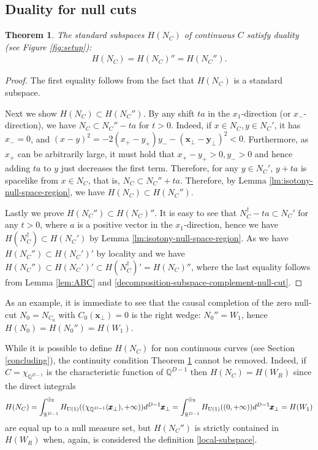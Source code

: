 \documentclass[12pt]{article}
\def\RR{{\mathbb R}}
\def\uone{{\rm U(1)}}
\def\tx{\pmb{x}}
\newtheorem{theorem}{Theorem}[section]
\theoremstyle{remark}
\begin{document}
\subsection{Duality for null cuts}

\begin{theorem}\label{thm:completeness}
	The standard subspaces $H(N_C)$ of continuous $C$ satisfy duality (see Figure \ref{fig:setup}): 
	\begin{align*}
		H(N_C)=H(N_C)''=H(N_C'').
	\end{align*}
\end{theorem} 
\begin{proof}
	The first equality follows from the fact that $H(N_C)$ is a standard subspace.
	
	
	Next we show $H(N_C) \subset H(N_C'')$.
	By any shift $ta$ in the $x_1$-direction (or $x_-$-direction), we have $N_C \subset N_C'' - ta$ for $t>0$.
	Indeed, if $x \in N_C, y\in N_C'$, it has $x_- = 0$, and $(x - y)^2 = -2(x_+ - y_+)y_- - (\pmb{x}_\perp - \pmb{y}_\perp)^2 < 0$.
	Furthermore, as $x_+$ can be arbitrarily large, it must hold that $x_+ - y_+>0, y_->0$
	and hence adding $ta$ to $y$ just decreases the first term.
	Therefore, for any $y \in N_C'$, $y+ta$ is spacelike from $x \in N_C$, that is,
	$N_C \subset N_C'' + ta$.
	Therefore, by Lemma \ref{lm:isotony-null-space-region}, we have $H(N_C)\subset H(N_C'')$.
	
	Lastly we prove $H(N_C'') \subset H(N_C)''$.
	It is easy to see that $N_C^\dagger - ta \subset N_C'$
	for any $t>0$, where $a$ is a positive vector in the $x_1$-direction,
	hence we have $H(N_C^\dagger) \subset H(N_C')$ by Lemma \ref{lm:isotony-null-space-region}.
	As we have $H(N_C'') \subset H(N_C')'$ by locality and
	we have $H(N_C'') \subset H(N_C')' \subset H(N_C^\dagger)' = H(N_C)''$,
	where the last equality follows from Lemma \ref{lem:ABC} and \eqref{decomposition-subspace-complement-null-cut}.

	
\end{proof}

As an example, it is immediate to see that the causal completion of the zero null-cut $N_0 = N_{C_0}$ with $C_0(\tx_\perp) = 0$ is the right wedge: $N_0''=W_1$, hence $H(N_0)=H(N_0'')=H(W_1)$.

While it is possible to define $H(N_C)$ for non continuous curves (see Section \ref{concluding}),
the continuity condition Theorem \ref{thm:completeness} cannot be removed.
Indeed, if $C=\chi_{\mathbb{Q}^{D-1}}$ is the characteristic function of $\mathbb Q^{D-1}$ then $H(N_C)=H(W_R)$
since the direct integrals 
\begin{align*}
	H(N_C)=\int_{\RR^{D-1}}^{\oplus_\RR} H_\uone((\chi_{\mathbb{Q}^{D-1}}(\tx_\perp),+\infty))d^{D-1}\tx_\perp=\int_{\RR^{D-1}}^{\oplus_\RR} H_\uone((0,+\infty))d^{D-1}\tx_\perp=H(W_1)
\end{align*}
are equal up to a null measure set,  but  $H(N_C'')$ is strictly contained in $H(W_R)$ when, again, is considered the definition \eqref{local-subspace}.
\end{document}
